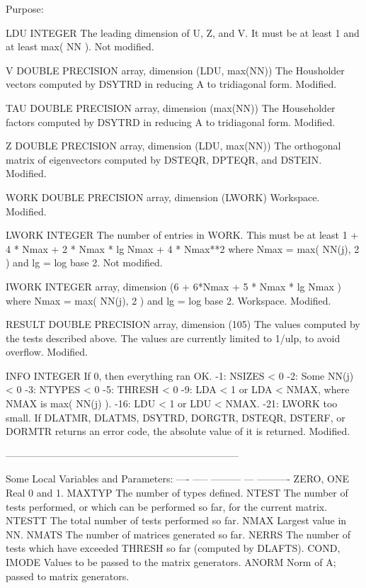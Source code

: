 \begin{DoxyParagraph}{Purpose\+: }
\begin{DoxyVerb}
  LDU     INTEGER
          The leading dimension of U, Z, and V.  It must be at
          least 1 and at least max( NN ).
          Not modified.

  V       DOUBLE PRECISION array, dimension (LDU, max(NN))
          The Housholder vectors computed by DSYTRD in reducing A to
          tridiagonal form.
          Modified.

  TAU     DOUBLE PRECISION array, dimension (max(NN))
          The Householder factors computed by DSYTRD in reducing A
          to tridiagonal form.
          Modified.

  Z       DOUBLE PRECISION array, dimension (LDU, max(NN))
          The orthogonal matrix of eigenvectors computed by DSTEQR,
          DPTEQR, and DSTEIN.
          Modified.

  WORK    DOUBLE PRECISION array, dimension (LWORK)
          Workspace.
          Modified.

  LWORK   INTEGER
          The number of entries in WORK.  This must be at least
          1 + 4 * Nmax + 2 * Nmax * lg Nmax + 4 * Nmax**2
          where Nmax = max( NN(j), 2 ) and lg = log base 2.
          Not modified.

  IWORK   INTEGER array,
             dimension (6 + 6*Nmax + 5 * Nmax * lg Nmax )
          where Nmax = max( NN(j), 2 ) and lg = log base 2.
          Workspace.
          Modified.

  RESULT  DOUBLE PRECISION array, dimension (105)
          The values computed by the tests described above.
          The values are currently limited to 1/ulp, to avoid
          overflow.
          Modified.

  INFO    INTEGER
          If 0, then everything ran OK.
           -1: NSIZES < 0
           -2: Some NN(j) < 0
           -3: NTYPES < 0
           -5: THRESH < 0
           -9: LDA < 1 or LDA < NMAX, where NMAX is max( NN(j) ).
          -16: LDU < 1 or LDU < NMAX.
          -21: LWORK too small.
          If  DLATMR, DLATMS, DSYTRD, DORGTR, DSTEQR, DSTERF,
              or DORMTR returns an error code, the
              absolute value of it is returned.
          Modified.

-----------------------------------------------------------------------

       Some Local Variables and Parameters:
       ---- ----- --------- --- ----------
       ZERO, ONE       Real 0 and 1.
       MAXTYP          The number of types defined.
       NTEST           The number of tests performed, or which can
                       be performed so far, for the current matrix.
       NTESTT          The total number of tests performed so far.
       NMAX            Largest value in NN.
       NMATS           The number of matrices generated so far.
       NERRS           The number of tests which have exceeded THRESH
                       so far (computed by DLAFTS).
       COND, IMODE     Values to be passed to the matrix generators.
       ANORM           Norm of A; passed to matrix generators.


\end{DoxyVerb}
\end{DoxyParagraph}
